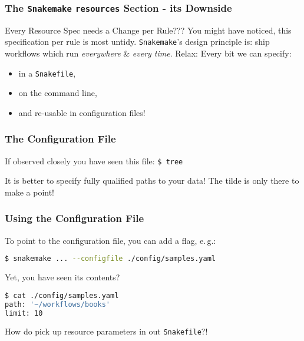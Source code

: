 \begin{frame}
  \frametitle{The \texttt{Snakemake} \texttt{resources} Section - its Downside}
  \begin{alertblock}{Every Resource Spec needs a Change per Rule???}
   You might have noticed, this specification per rule is most untidy. \texttt{Snakemake}'s design principle is: ship workflows which run \emph{everywhere} \& \emph{every time}.
   \newline \pause
   Relax: Every bit we can specify:
   \begin{itemize}
    \item in a \texttt{Snakefile},
    \item on the command line,
    \item and re-usable in configuration files!
   \end{itemize}

  \end{alertblock}

\end{frame} 

\begin{frame}
  \frametitle{The Configuration File}
  If observed closely you have seen this file:\newline
            {\tiny \DTsetlength{0.2em}{1em}{0.2em}{0.4pt}{.6pt}
\texttt{\$ tree}
}
 \pause
 \pause
 \begin{warning}
 	It is better to specify fully qualified paths to your data! The tilde is only there to make a point!
 \end{warning}
\end{frame}

\begin{frame}[fragile]
  \frametitle{Using the Configuration File}
  To point to the configuration file, you can add a flag, e.\,g.:
  \begin{lstlisting}[language=Bash, style=Shell]
$ snakemake ... --configfile ./config/samples.yaml  
  \end{lstlisting}
  Yet, you have seen its contents?
  \begin{lstlisting}[language=Bash, style=Shell]
$ cat ./config/samples.yaml
path: '~/workflows/books'
limit: 10
  \end{lstlisting}
  \begin{question}
  	How do pick up resource parameters in out \texttt{Snakefile}?!
  \end{question}
\end{frame} 

